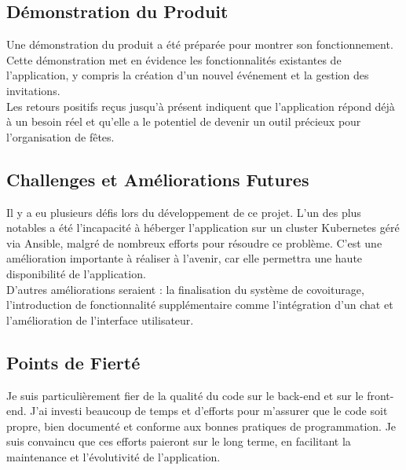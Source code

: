\subsection{Démonstration du Produit}\label{subsec:demonstration-du-produit}

Une démonstration du produit a été préparée pour montrer son fonctionnement.
Cette démonstration met en évidence les fonctionnalités existantes de l'application, y compris la création d'un nouvel événement et la gestion des invitations.\\

Les retours positifs reçus jusqu'à présent indiquent que l'application répond déjà à
un besoin réel et qu'elle a le potentiel de devenir un outil précieux pour l'organisation de fêtes.

\subsection{Challenges et Améliorations Futures}\label{subsec:challenges-et-ameliorations-futures}

Il y a eu plusieurs défis lors du développement de ce projet.
L'un des plus notables a été l'incapacité à héberger l'application sur un cluster Kubernetes géré via Ansible,
malgré de nombreux efforts pour résoudre ce problème.
C'est une amélioration importante à réaliser à l'avenir, car elle permettra une haute disponibilité de l'application.\\

D'autres améliorations seraient : la finalisation du système de covoiturage, l'introduction de fonctionnalité supplémentaire comme l'intégration d'un chat
et l'amélioration de l'interface utilisateur.

\subsection{Points de Fierté}\label{subsec:points-de-fierte}

Je suis particulièrement fier de la qualité du code sur le back-end et sur le front-end.
J'ai investi beaucoup de temps et d'efforts pour m'assurer que le code soit propre, bien documenté et conforme aux bonnes pratiques de programmation.
Je suis convaincu que ces efforts paieront sur le long terme, en facilitant la maintenance et l'évolutivité de l'application.